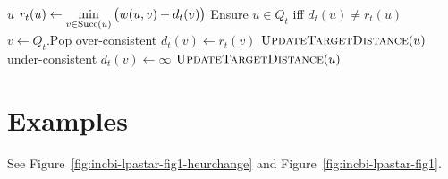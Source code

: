 {\begin{algorithm}[t]
\begin{minipage}[t]{8.2cm}
\begin{algorithmic}[1]
          {$u$}
               \State $r_t(u) \gets \displaystyle\min_{v \in \mbox{\scriptsize Succ}(u)}
                  \big( w(u,v) + d_t(v) \big)$
            \EndIf
            \State Ensure $u \in Q_t$ iff $d_t(u) \neq r_t(u)$
         \EndProcedure
          {\,\!}
            \State $v \gets Q_t.\mbox{Pop}$
                  \Comment over-consistent
               \State $d_t(v) \gets r_t(v)$
                  \State $\mbox{\sc UpdateTargetDistance}(u)$
               \EndFor
            \Else
                  \Comment under-consistent
               \State $d_t(v) \gets \infty$
                  \State $\mbox{\sc UpdateTargetDistance}(u)$
               \EndFor
            \EndIf
         \EndProcedure
      \end{algorithmic}
   \end{minipage}
\end{algorithm}
} %

\section{Examples}

See Figure~\ref{fig:incbi-lpastar-fig1-heurchange}
and Figure~\ref{fig:incbi-lpastar-fig1}.

